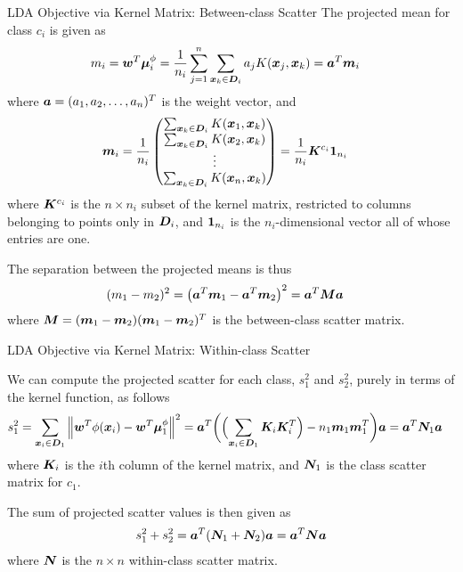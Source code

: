 \begin{frame}{LDA Objective via Kernel Matrix: Between-class Scatter}
\small
The projected mean for class $c_i$ is given as
\begin{align*}
   m_i & = {\boldsymbol w}^T {\bm \mu}^\phi_i
   = {1 \over n_i} \displaystyle \sum_{j=1}^n \displaystyle \sum_{{\boldsymbol x}_k \in {\boldsymbol D}_i} a_{j}
  K({\boldsymbol x}_{j},{\boldsymbol x}_k) = {\boldsymbol a}^T {\boldsymbol m}_i 
\end{align*}
where ${\boldsymbol a} = (a_1, a_2, \ldots, a_n)^T$ is the weight vector, and
\begin{align*}
  {\boldsymbol m}_i & = {1 \over n_i}
  \begin{pmatrix} 
      \sum_{{\boldsymbol x}_k \in {\boldsymbol D}_i} K({\boldsymbol x}_1,{\boldsymbol x}_k)\\
      \sum_{{\boldsymbol x}_k \in {\boldsymbol D}_i} K({\boldsymbol x}_2,{\boldsymbol x}_k)\\
      \vdots\\
      \sum_{{\boldsymbol x}_k \in {\boldsymbol D}_i} K({\boldsymbol x}_n,{\boldsymbol x}_k)
       \end{pmatrix}  = {1\over n_i}{\boldsymbol K}^{c_i} \mathbf{1}_{n_i}
\end{align*}
where ${\boldsymbol K}^{c_i}$ is the $n \times n_i$ subset of the kernel
matrix, restricted to columns belonging to points only in ${\boldsymbol D}_i$,
and $\mathbf{1}_{n_i}$ is the $n_i$-dimensional vector all of whose
entries are one. 

\medskip
The separation between the projected means is thus
\begin{align*}
  (m_1 - m_2)^2  & =  \left({\boldsymbol a}^T{\boldsymbol m}_1 - {\boldsymbol a}^T{\boldsymbol m}_2\right)^2 
     =  {\boldsymbol a}^T{\boldsymbol M}{\boldsymbol a}
\end{align*}
where ${\boldsymbol M} = ({\boldsymbol m}_1 - {\boldsymbol m}_2)({\boldsymbol m}_1-{\boldsymbol m}_2)^T$ is the
between-class scatter matrix.
\end{frame}


\begin{frame}{LDA Objective via Kernel Matrix: Within-class Scatter}

We can compute the projected scatter for each class, $s_1^2$
and $s_2^2$, purely in terms of the kernel function, as follows
\begin{align*}
    s_1^2 & = \sum_{{\boldsymbol x}_i \in {\boldsymbol D}_1}
    \left\lVert{\boldsymbol w}^T\phi({\boldsymbol x}_i) - {\boldsymbol w}^T{\bm \mu}^\phi_1\right\rVert^2
    = {\boldsymbol a}^T \biggl(
    \Bigl(\sum_{{\boldsymbol x}_i \in {\boldsymbol D}_1} {\boldsymbol K}_i{\boldsymbol K}_i^T\Bigr)
    - n_1 {\boldsymbol m}_1 {\boldsymbol m}_1^T \biggr) {\boldsymbol a}
     = {\boldsymbol a}^T {\boldsymbol N}_1 {\boldsymbol a}
\end{align*}
where ${\boldsymbol K}_i$ is the $i$th column of the kernel matrix, and ${\boldsymbol N}_1$
is the class scatter matrix for $c_1$. 

\medskip
The sum of projected scatter values is then given as
\begin{align*}
  s_1^2 + s_2^2 = {\boldsymbol a}^T ({\boldsymbol N}_1 + {\boldsymbol N}_2) {\boldsymbol a} = {\boldsymbol a}^T {\boldsymbol N} {\boldsymbol a}
\end{align*}
where ${\boldsymbol N}$ is the $n\times n$ within-class scatter matrix.
\end{frame}

